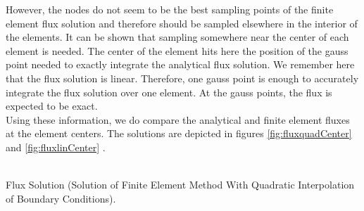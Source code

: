 \documentclass[a4paper,12pt]{article}
\makeatletter
\newenvironment{figurehere}
  {\def\@captype{figure}}
  {}
\makeatother
\begin{document}
However, the nodes do not seem to be the best sampling points of the finite element flux solution and therefore should be sampled elsewhere in the interior of the elements. It can be shown that sampling somewhere near the center of each element is needed. The center of the element hits here the position of the gauss point needed to exactly integrate the analytical flux solution. We remember here that the flux solution is linear. Therefore, one gauss point is enough to accurately integrate the flux solution over one element. At the gauss points, the flux is expected to be exact.\\
Using these information, we do compare the analytical and finite element fluxes at the element centers. The solutions are depicted in figures \ref{fig:fluxquadCenter}
and \ref{fig:fluxlinCenter} .
\begin{center}
\begin{figurehere} 
\\
\caption{Flux Solution (Solution of Finite Element Method With Quadratic Interpolation of Boundary Conditions).}\label{fig:fluxquadCenter}
\end{figurehere} 
\end{center}
\end{document}
